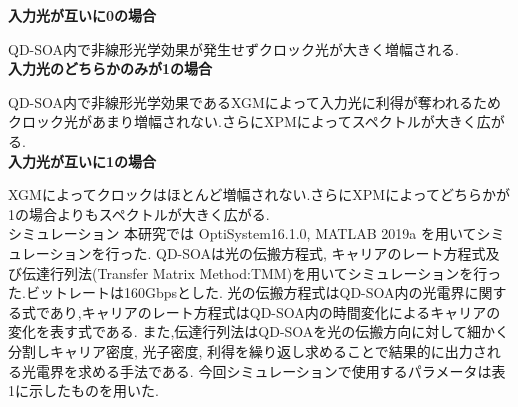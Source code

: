 \documentclass[dvipdfmx]{ujarticle}
\makeatletter
\def\section{\@startsection{section}{1}{\z@}
   {0.8\Cvs \@plus.5\Cdp \@minus.2\Cdp}
   {0.2\Cvs \@plus.3\Cdp}
   {\normalfont \Large \bfseries}}
\def\section{\@startsection{section}{1}{\z@}
   {0.8\Cvs \@plus.5\Cdp \@minus.2\Cdp}
   {0.2\Cvs \@plus.3\Cdp}
   {\normalfont \Large \bfseries}}
\makeatother
\begin{document}
    \textbf{入力光が互いに0の場合} \par
    QD-SOA内で非線形光学効果が発生せずクロック光が大きく増幅される.\\
    \textbf{入力光のどちらかのみが1の場合} \par
    QD-SOA内で非線形光学効果であるXGMによって入力光に利得が奪われるためクロック光があまり増幅されない.さらにXPMによってスペクトルが大きく広がる.\\
    \textbf{入力光が互いに1の場合}\par
    XGMによってクロックはほとんど増幅されない.さらにXPMによってどちらかが1の場合よりもスペクトルが大きく広がる.\\

\section{シミュレーション}
    本研究では OptiSystem16.1.0, MATLAB 2019a を用いてシミュレーションを行った.
    QD-SOAは光の伝搬方程式, キャリアのレート方程式及び伝達行列法(Transfer Matrix Method:TMM)を用いてシミュレーションを行った.ビットレートは160Gbpsとした.
    光の伝搬方程式はQD-SOA内の光電界に関する式であり,キャリアのレート方程式はQD-SOA内の時間変化によるキャリアの変化を表す式である.
    また,伝達行列法はQD-SOAを光の伝搬方向に対して細かく分割しキャリア密度, 光子密度, 利得を繰り返し求めることで結果的に出力される光電界を求める手法である.
    今回シミュレーションで使用するパラメータは表1に示したものを用いた.
\end{document}
